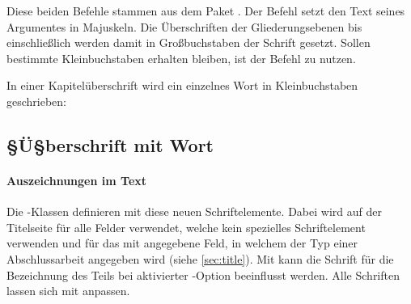 \begin{Declaration}{}%
\begin{Declaration}{}%
\printdeclarationlist%
%
%
Diese beiden Befehle stammen aus dem Paket . Der Befehl 
 setzt den Text seines Argumentes in Majuskeln. Die 
Überschriften der Gliederungsebenen bis einschließlich  
werden damit in Großbuchstaben der Schrift \DIN gesetzt. Sollen bestimmte 
Kleinbuchstaben erhalten bleiben, ist der Befehl  zu nutzen.
\end{Declaration}
\end{Declaration}
%
\begin{Example}
In einer Kapitelüberschrift wird ein einzelnes Wort in Kleinbuchstaben 
geschrieben:
\begin{Code}[escapechar=§]
\chapter{§Ü§berschrift mit  Wort}
\end{Code}
\end{Example}


\subsubsection{Auszeichnungen im Text}
\begin{Declaration}[v2.02]{}
\begin{Declaration}[v2.02]{}
\begin{Declaration}[v2.02]{}
\printdeclarationlist%
%
Die \TUDScript-Klassen definieren mit  diese neuen 
Schriftelemente. Dabei wird  auf der Titelseite für alle 
Felder verwendet, welche kein spezielles Schriftelement verwenden und 
 für das mit  angegebene Feld, in welchem der Typ 
einer Abschlussarbeit angegeben wird (siehe \autoref{sec:title}). Mit 
 kann die Schrift für die Bezeichnung des Teils bei 
aktivierter -Option beeinflusst werden. Alle Schriften lassen 
sich mit  anpassen.
\end{Declaration}
\end{Declaration}
\end{Declaration}

